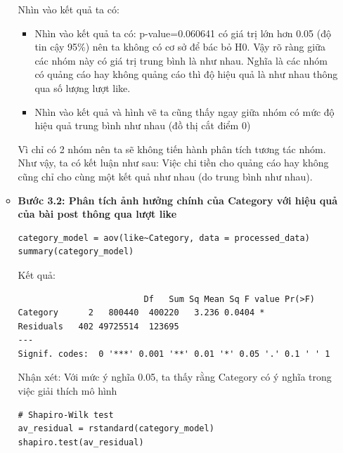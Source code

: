 \begin{itemize}
\begin{itemize}
    Nhìn vào kết quả ta có: \begin{itemize}
        \item Nhìn vào kết quả ta có: p-value=0.060641 có giá trị lớn hơn 0.05 (độ tin cậy 95\%) nên ta không có cơ sở để bác bỏ H0. Vậy rõ ràng giữa các nhóm này có giá trị trung bình là như nhau. Nghĩa là các nhóm có quảng cáo hay không quảng cáo thì độ hiệu quả là như nhau thông qua số lượng lượt like.
        \item Nhìn vào kết quả và hình vẽ ta cũng thấy ngay giữa nhóm có mức độ hiệu quả trung bình như nhau (đồ thị cắt điểm 0)
    \end{itemize}
Vì chỉ có 2 nhóm nên ta sẽ không tiến hành phân tích tương tác nhóm. Như vậy, ta có kết luận như sau: Việc chi tiền cho quảng cáo hay không cũng chỉ cho cùng một kết quả như nhau (do trung bình như nhau).

\item \textbf{Bước 3.2: Phân tích ảnh hưởng chính của Category với hiệu quả của bài post thông qua lượt like}
    \begin{lstlisting}
category_model = aov(like~Category, data = processed_data)
summary(category_model)
    \end{lstlisting}

Kết quả:
    \begin{lstlisting}
                         Df   Sum Sq Mean Sq F value Pr(>F)  
Category      2   800440  400220   3.236 0.0404 *
Residuals   402 49725514  123695                 
---
Signif. codes:  0 '***' 0.001 '**' 0.01 '*' 0.05 '.' 0.1 ' ' 1
    \end{lstlisting}
Nhận xét: Với mức ý nghĩa 0.05, ta thấy rằng Category có ý nghĩa trong việc giải thích mô hình

\begin{lstlisting}
# Shapiro-Wilk test
av_residual = rstandard(category_model)
shapiro.test(av_residual)


\end{lstlisting}
\end{itemize}
\end{itemize}
